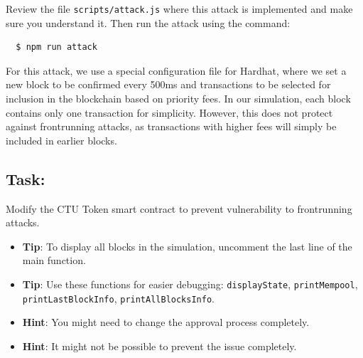 \documentclass[12pt]{article}
\begin{document}
\medskip
\noindent
Review the file \texttt{scripts/attack.js} where this attack is implemented and make sure you understand it. Then run the attack using the command:

\begin{verbatim}
  $ npm run attack
\end{verbatim}

For this attack, we use a special configuration file for Hardhat, where we set a new block to be confirmed every 500ms and transactions to be selected for inclusion in the blockchain based on priority fees. In our simulation, each block contains only one transaction for simplicity. However, this does not protect against frontrunning attacks, as transactions with higher fees will simply be included in earlier blocks. 

\subsection*{Task:} Modify the CTU Token smart contract to prevent vulnerability to frontrunning attacks.

\begin{itemize}
  \item \textbf{Tip}: To display all blocks in the simulation, uncomment the last line of the main function.
    \item \textbf{Tip}: Use these functions for easier debugging: \texttt{displayState}, \texttt{printMempool}, \texttt{printLastBlockInfo}, \texttt{printAllBlocksInfo}.
    \item \textbf{Hint}: You might need to change the approval process completely.
    \item \textbf{Hint}: It might not be possible to prevent the issue completely.
\end{itemize}
\end{document}
